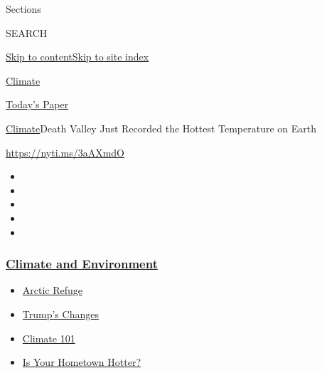 Sections

SEARCH

\protect\hyperlink{site-content}{Skip to
content}\protect\hyperlink{site-index}{Skip to site index}

\href{https://www.nytimes3xbfgragh.onion/section/climate}{Climate}

\href{https://myaccount.nytimes3xbfgragh.onion/auth/login?response_type=cookie\&client_id=vi}{}

\href{https://www.nytimes3xbfgragh.onion/section/todayspaper}{Today's
Paper}

\href{/section/climate}{Climate}\textbar{}Death Valley Just Recorded the
Hottest Temperature on Earth

\url{https://nyti.ms/3aAXmdO}

\begin{itemize}
\item
\item
\item
\item
\item
\end{itemize}

\hypertarget{climate-and-environment}{%
\subsubsection{\texorpdfstring{\href{https://www.nytimes3xbfgragh.onion/section/climate?name=styln-climate\&region=TOP_BANNER\&variant=undefined\&block=storyline_menu_recirc\&action=click\&pgtype=Article\&impression_id=c3e73840-e384-11ea-8a8e-3f7ffed08450}{Climate
and
Environment}}{Climate and Environment}}\label{climate-and-environment}}

\begin{itemize}
\tightlist
\item
  \href{https://www.nytimes3xbfgragh.onion/2020/08/17/climate/alaska-oil-drilling-anwr.html?name=styln-climate\&region=TOP_BANNER\&variant=undefined\&block=storyline_menu_recirc\&action=click\&pgtype=Article\&impression_id=c3e75f50-e384-11ea-8a8e-3f7ffed08450}{Arctic
  Refuge}
\item
  \href{https://www.nytimes3xbfgragh.onion/interactive/2020/climate/trump-environment-rollbacks.html?name=styln-climate\&region=TOP_BANNER\&variant=undefined\&block=storyline_menu_recirc\&action=click\&pgtype=Article\&impression_id=c3e75f51-e384-11ea-8a8e-3f7ffed08450}{Trump's
  Changes}
\item
  \href{https://www.nytimes3xbfgragh.onion/interactive/2020/04/19/climate/climate-crash-course-1.html?name=styln-climate\&region=TOP_BANNER\&variant=undefined\&block=storyline_menu_recirc\&action=click\&pgtype=Article\&impression_id=c3e75f52-e384-11ea-8a8e-3f7ffed08450}{Climate
  101}
\item
  \href{https://www.nytimes3xbfgragh.onion/interactive/2018/08/30/climate/how-much-hotter-is-your-hometown.html?name=styln-climate\&region=TOP_BANNER\&variant=undefined\&block=storyline_menu_recirc\&action=click\&pgtype=Article\&impression_id=c3e75f53-e384-11ea-8a8e-3f7ffed08450}{Is
  Your Hometown Hotter?}
\end{itemize}

